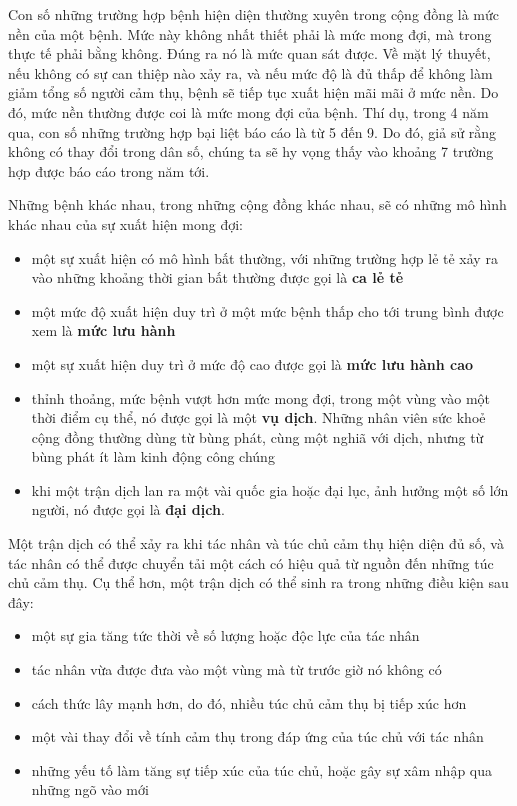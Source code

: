 \documentclass[
]{book}
\providecommand{\tightlist}{%
  \setlength{\itemsep}{0pt}\setlength{\parskip}{0pt}}
\begin{document}
Con số những trường hợp bệnh hiện diện thường xuyên trong cộng đồng là mức nền của một bệnh. Mức này không nhất thiết phải là mức mong đợi, mà trong thực tế phải bằng không. Đúng ra nó là mức quan sát được. Về mặt lý thuyết, nếu không có sự can thiệp nào xảy ra, và nếu mức độ là đủ thấp để không làm giảm tổng số người cảm thụ, bệnh sẽ tiếp tục xuất hiện mãi mãi ở mức nền. Do đó, mức nền thường được coi là mức mong đợi của bệnh. Thí dụ, trong 4 năm qua, con số những trường hợp bại liệt báo cáo là từ 5 đến 9. Do đó, giả sử rằng không có thay đổi trong dân số, chúng ta sẽ hy vọng thấy vào khoảng 7 trường hợp được báo cáo trong năm tới.

Những bệnh khác nhau, trong những cộng đồng khác nhau, sẽ có những mô hình khác nhau của sự xuất hiện mong đợi:

\begin{itemize}
\tightlist
\item
  một sự xuất hiện có mô hình bất thường, với những trường hợp lẻ tẻ xảy ra vào những khoảng thời gian bất thường được gọi là \textbf{ca lẻ tẻ}
\item
  một mức độ xuất hiện duy trì ở một mức bệnh thấp cho tới trung bình được xem là \textbf{mức lưu hành}
\item
  một sự xuất hiện duy trì ở mức độ cao được gọi là \textbf{mức lưu hành cao}
\item
  thỉnh thoảng, mức bệnh vượt hơn mức mong đợi, trong một vùng vào một thời điểm cụ thể, nó được gọi là một \textbf{vụ dịch}. Những nhân viên sức khoẻ cộng đồng thường dùng từ bùng phát, cùng một nghiã với dịch, nhưng từ bùng phát ít làm kinh động công chúng
\item
  khi một trận dịch lan ra một vài quốc gia hoặc đại lục, ảnh hưởng một số lớn người, nó được gọi là \textbf{đại dịch}.
\end{itemize}

Một trận dịch có thể xảy ra khi tác nhân và túc chủ cảm thụ hiện diện đủ số, và tác nhân có thể được chuyển tải một cách có hiệu quả từ nguồn đến những túc chủ cảm thụ. Cụ thể hơn, một trận dịch có thể sinh ra trong những điều kiện sau đây:

\begin{itemize}
\tightlist
\item
  một sự gia tăng tức thời về số lượng hoặc độc lực của tác nhân
\item
  tác nhân vừa được đưa vào một vùng mà từ trước giờ nó không có
\item
  cách thức lây mạnh hơn, do đó, nhiều túc chủ cảm thụ bị tiếp xúc hơn
\item
  một vài thay đổi về tính cảm thụ trong đáp ứng của túc chủ với tác nhân
\item
  những yếu tố làm tăng sự tiếp xúc của túc chủ, hoặc gây sự xâm nhập qua những ngõ vào mới
\end{itemize}
\end{document}
